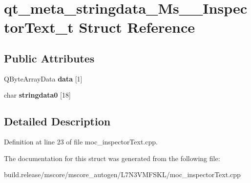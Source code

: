 \hypertarget{structqt__meta__stringdata___ms_____inspector_text__t}{}\section{qt\+\_\+meta\+\_\+stringdata\+\_\+\+Ms\+\_\+\+\_\+\+Inspector\+Text\+\_\+t Struct Reference}
\label{structqt__meta__stringdata___ms_____inspector_text__t}
\subsection*{Public Attributes}
\begin{DoxyCompactItemize}
\item 
\mbox{\label{structqt__meta__stringdata___ms_____inspector_text__t_acf6697c047f05da3afa4eb886823b0c9}} 
Q\+Byte\+Array\+Data {\bfseries data} \mbox{[}1\mbox{]}
\item 
\mbox{\label{structqt__meta__stringdata___ms_____inspector_text__t_a474f710b6a7c1628aa409e0054d0d5a3}} 
char {\bfseries stringdata0} \mbox{[}18\mbox{]}
\end{DoxyCompactItemize}


\subsection{Detailed Description}


Definition at line 23 of file moc\+\_\+inspector\+Text.\+cpp.



The documentation for this struct was generated from the following file\+:\begin{DoxyCompactItemize}
\item 
build.\+release/mscore/mscore\+\_\+autogen/\+L7\+N3\+V\+M\+F\+S\+K\+L/moc\+\_\+inspector\+Text.\+cpp\end{DoxyCompactItemize}
